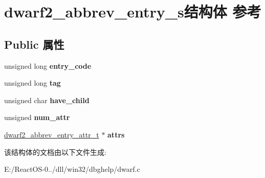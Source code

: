 \hypertarget{structdwarf2__abbrev__entry__s}{}\section{dwarf2\+\_\+abbrev\+\_\+entry\+\_\+s结构体 参考}
\label{structdwarf2__abbrev__entry__s}
\subsection*{Public 属性}
\begin{DoxyCompactItemize}
\item 
\mbox{\label{structdwarf2__abbrev__entry__s_adce58ff0f089388152bd1154ab9eebde}} 
unsigned long {\bfseries entry\+\_\+code}
\item 
\mbox{\label{structdwarf2__abbrev__entry__s_a648fc584db6ac709c7e74857a0d6272c}} 
unsigned long {\bfseries tag}
\item 
\mbox{\label{structdwarf2__abbrev__entry__s_ab033c63ae9946fe650f4966a3c2ae35f}} 
unsigned char {\bfseries have\+\_\+child}
\item 
\mbox{\label{structdwarf2__abbrev__entry__s_ac13075d6ee4dc12eb29dae7b3105ad9f}} 
unsigned {\bfseries num\+\_\+attr}
\item 
\mbox{\label{structdwarf2__abbrev__entry__s_a41f5eeb4f5b8cddc6cce297203da804c}} 
\hyperlink{structdwarf2__abbrev__entry__attr__s}{dwarf2\+\_\+abbrev\+\_\+entry\+\_\+attr\+\_\+t} $\ast$ {\bfseries attrs}
\end{DoxyCompactItemize}


该结构体的文档由以下文件生成\+:\begin{DoxyCompactItemize}
\item 
E\+:/\+React\+O\+S-\/0../dll/win32/dbghelp/dwarf.\+c\end{DoxyCompactItemize}
